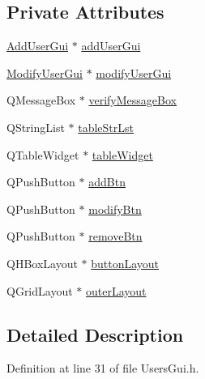 \subsection*{Private Attributes}
\begin{DoxyCompactItemize}
\item 
\hyperlink{class_add_user_gui}{Add\-User\-Gui} $\ast$ \hyperlink{class_users_gui_a924224ccc0c66bafbd23ef8160a864ac}{add\-User\-Gui}
\item 
\hyperlink{class_modify_user_gui}{Modify\-User\-Gui} $\ast$ \hyperlink{class_users_gui_ab471067855fb1bb29765b84d95757d15}{modify\-User\-Gui}
\item 
Q\-Message\-Box $\ast$ \hyperlink{class_users_gui_a2106e2bb4eff998f492a727fe611acf4}{verify\-Message\-Box}
\item 
Q\-String\-List $\ast$ \hyperlink{class_users_gui_ac67b9bbba0ce047974c41af428a78890}{table\-Str\-Lst}
\item 
Q\-Table\-Widget $\ast$ \hyperlink{class_users_gui_aefd7e17606815c3ed57943a671733a76}{table\-Widget}
\item 
Q\-Push\-Button $\ast$ \hyperlink{class_users_gui_a477309ccb4c91b6969e665b61d25e768}{add\-Btn}
\item 
Q\-Push\-Button $\ast$ \hyperlink{class_users_gui_a127be893a811158fa4955ce7c7cb38e0}{modify\-Btn}
\item 
Q\-Push\-Button $\ast$ \hyperlink{class_users_gui_a6b6649374ed3a00b5e714ad2ea868ef7}{remove\-Btn}
\item 
Q\-H\-Box\-Layout $\ast$ \hyperlink{class_users_gui_a007a2cbe56519f9df8492d4632e06285}{button\-Layout}
\item 
Q\-Grid\-Layout $\ast$ \hyperlink{class_users_gui_a39c97994b8b367069c5d4b1aa5e7a1df}{outer\-Layout}
\end{DoxyCompactItemize}


\subsection{Detailed Description}


Definition at line 31 of file Users\-Gui.\-h.



